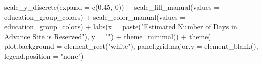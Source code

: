 \documentclass[
  11 pt,
  openany]{book}
\newenvironment{Shaded}{\begin{snugshade}}{\end{snugshade}}
\newcommand{\AttributeTok}[1]{\textcolor[rgb]{0.77,0.63,0.00}{#1}}
\newcommand{\DecValTok}[1]{\textcolor[rgb]{0.00,0.00,0.81}{#1}}
\newcommand{\FloatTok}[1]{\textcolor[rgb]{0.00,0.00,0.81}{#1}}
\newcommand{\FunctionTok}[1]{\textcolor[rgb]{0.00,0.00,0.00}{#1}}
\newcommand{\NormalTok}[1]{#1}
\newcommand{\SpecialCharTok}[1]{\textcolor[rgb]{0.00,0.00,0.00}{#1}}
\newcommand{\StringTok}[1]{\textcolor[rgb]{0.31,0.60,0.02}{#1}}
\begin{document}
\begin{Shaded}
\begin{Highlighting}[]
  \FunctionTok{scale\_y\_discrete}\NormalTok{(}\AttributeTok{expand =} \FunctionTok{c}\NormalTok{(}\FloatTok{0.45}\NormalTok{, }\DecValTok{0}\NormalTok{)) }\SpecialCharTok{+}
  \FunctionTok{scale\_fill\_manual}\NormalTok{(}\AttributeTok{values =}\NormalTok{ education\_group\_colors) }\SpecialCharTok{+}
  \FunctionTok{scale\_color\_manual}\NormalTok{(}\AttributeTok{values =}\NormalTok{ education\_group\_colors) }\SpecialCharTok{+}
  \FunctionTok{labs}\NormalTok{(}\AttributeTok{x =} \FunctionTok{paste}\NormalTok{(}\StringTok{"Estimated Number of Days in Advance Site is Reserved"}\NormalTok{),}
       \AttributeTok{y =} \StringTok{""}\NormalTok{) }\SpecialCharTok{+}
  \FunctionTok{theme\_minimal}\NormalTok{() }\SpecialCharTok{+}
  \FunctionTok{theme}\NormalTok{(}
    \AttributeTok{plot.background =} \FunctionTok{element\_rect}\NormalTok{(}\StringTok{"white"}\NormalTok{),}
    \AttributeTok{panel.grid.major.y =} \FunctionTok{element\_blank}\NormalTok{(),}
    \AttributeTok{legend.position =} \StringTok{"none"}\NormalTok{)}


\end{Highlighting}
\end{Shaded}
\end{document}
